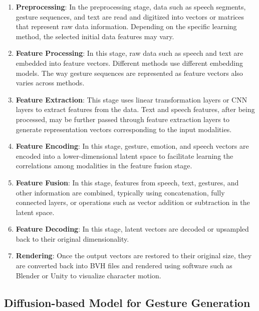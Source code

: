 \begin{enumerate}
	\item \textbf{Preprocessing}: In the preprocessing stage, data such as speech segments, gesture sequences, and text are read and digitized into vectors or matrices that represent raw data information. Depending on the specific learning method, the selected initial data features may vary.
	
	\item \textbf{Feature Processing}: In this stage, raw data such as speech and text are embedded into feature vectors. Different methods use different embedding models. The way gesture sequences are represented as feature vectors also varies across methods.
	
	\item \textbf{Feature Extraction}: This stage uses linear transformation layers or CNN layers to extract features from the data. Text and speech features, after being processed, may be further passed through feature extraction layers to generate representation vectors corresponding to the input modalities.
	
	\item \textbf{Feature Encoding}: In this stage, gesture, emotion, and speech vectors are encoded into a lower-dimensional latent space to facilitate learning the correlations among modalities in the feature fusion stage.
	
	\item \textbf{Feature Fusion}: In this stage, features from speech, text, gestures, and other information are combined, typically using concatenation, fully connected layers, or operations such as vector addition or subtraction in the latent space.
	
	\item \textbf{Feature Decoding}: In this stage, latent vectors are decoded or upsampled back to their original dimensionality.
	
	\item \textbf{Rendering}: Once the output vectors are restored to their original size, they are converted back into BVH files and rendered using software such as Blender or Unity to visualize character motion.
\end{enumerate}


\subsection{Diffusion-based Model for Gesture Generation}


